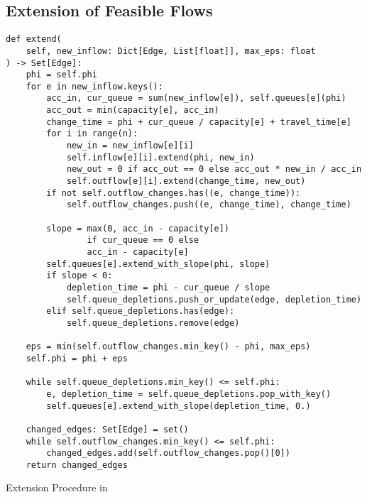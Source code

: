 \subsection{Extension of Feasible Flows}



\begin{algorithm}
    \begin{verbatim}
def extend(
    self, new_inflow: Dict[Edge, List[float]], max_eps: float
) -> Set[Edge]:
    phi = self.phi
    for e in new_inflow.keys():
        acc_in, cur_queue = sum(new_inflow[e]), self.queues[e](phi)
        acc_out = min(capacity[e], acc_in)
        change_time = phi + cur_queue / capacity[e] + travel_time[e]
        for i in range(n):
            new_in = new_inflow[e][i]
            self.inflow[e][i].extend(phi, new_in)
            new_out = 0 if acc_out == 0 else acc_out * new_in / acc_in
            self.outflow[e][i].extend(change_time, new_out)
        if not self.outflow_changes.has((e, change_time)):
            self.outflow_changes.push((e, change_time), change_time)
        
        slope = max(0, acc_in - capacity[e])
                if cur_queue == 0 else
                acc_in - capacity[e]
        self.queues[e].extend_with_slope(phi, slope)
        if slope < 0:
            depletion_time = phi - cur_queue / slope
            self.queue_depletions.push_or_update(edge, depletion_time)
        elif self.queue_depletions.has(edge):
            self.queue_depletions.remove(edge)

    eps = min(self.outflow_changes.min_key() - phi, max_eps)
    self.phi = phi + eps

    while self.queue_depletions.min_key() <= self.phi:
        e, depletion_time = self.queue_depletions.pop_with_key()
        self.queues[e].extend_with_slope(depletion_time, 0.)
    
    changed_edges: Set[Edge] = set()
    while self.outflow_changes.min_key() <= self.phi:
        changed_edges.add(self.outflow_changes.pop()[0])
    return changed_edges
    \end{verbatim}
    \caption{Extension Procedure in }
\end{algorithm}

